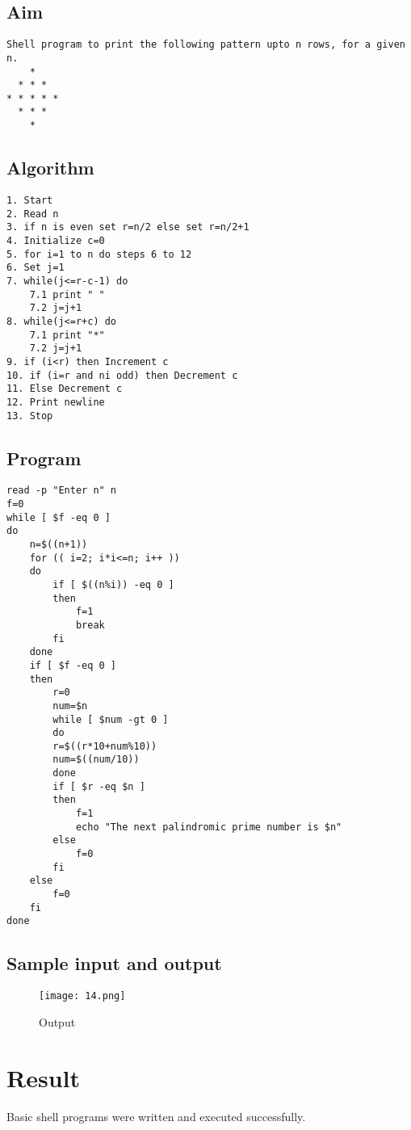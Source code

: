 \documentclass{article}
\begin{document}
\subsection{Aim}
\begin{Verbatim}[tabsize = 4]
Shell program to print the following pattern upto n rows, for a given n.
    *
  * * *
* * * * *
  * * *
    *
\end{Verbatim}
\subsection{Algorithm}
\begin{Verbatim}[tabsize = 4]
1. Start
2. Read n
3. if n is even set r=n/2 else set r=n/2+1
4. Initialize c=0
5. for i=1 to n do steps 6 to 12
6. Set j=1
7. while(j<=r-c-1) do
    7.1 print " "
    7.2 j=j+1
8. while(j<=r+c) do
    7.1 print "*"
    7.2 j=j+1
9. if (i<r) then Increment c
10. if (i=r and ni odd) then Decrement c
11. Else Decrement c
12. Print newline
13. Stop
\end{Verbatim}
\subsection{Program}
\begin{Verbatim}[tabsize = 4]
read -p "Enter n" n
f=0
while [ $f -eq 0 ]
do
    n=$((n+1))
    for (( i=2; i*i<=n; i++ ))
    do 
        if [ $((n%i)) -eq 0 ]
        then
            f=1
            break
        fi
    done
    if [ $f -eq 0 ]
    then
        r=0
        num=$n
        while [ $num -gt 0 ] 
        do
        r=$((r*10+num%10))
        num=$((num/10))
        done
        if [ $r -eq $n ]
        then
            f=1
            echo "The next palindromic prime number is $n"
        else
            f=0
        fi
    else
        f=0
    fi
done

\end{Verbatim}
\newpage
\thispagestyle{third}
\subsection{Sample input and output}
\begin{figure}[H]
    \centering
    \texttt{[image: 14.png]}
    \caption{Output}
    \label{fig:my_label2}
\end{figure}

\section{\Large Result}
    Basic shell programs were written and executed successfully.
\end{document}
